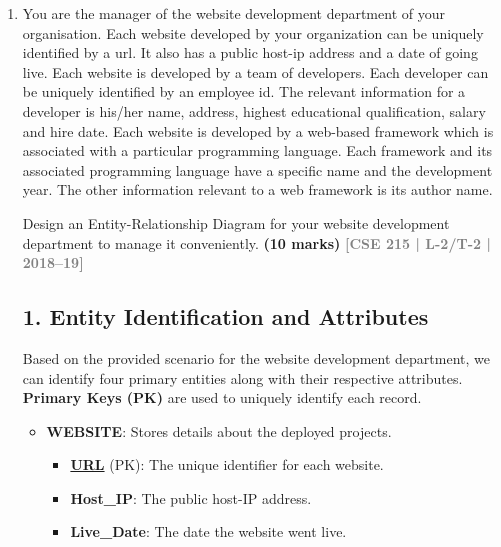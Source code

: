 \documentclass[12pt,a3paper]{article}
\newcommand{\yr}[1]{\hfill\textcolor{gray}{\small\textbf{[#1]}}}
\newcommand{\mk}[1]{\textcolor{orange!70!black}{\small\textbf{(#1 marks)}}}
\begin{document}
\begin{enumerate}


\item You are the manager of the website development department of your organisation.
Each website developed by your organization can be uniquely identified by a url. It also has
a public host-ip address and a date of going live. Each website is developed by a team of
developers. Each developer can be uniquely identified by an employee id. The relevant information
for a developer is his/her name, address, highest educational qualification, salary
and hire date. Each website is developed by a web-based framework which is associated
with a particular programming language. Each framework and its associated programming
language have a specific name and the development year. The other information relevant
to a web framework is its author name.

Design an Entity-Relationship Diagram for your website development department to manage it conveniently. 
\mk{10} \yr{CSE 215 | L-2/T-2 | 2018--19}

\begin{tcolorbox}[enhanced,breakable,ansbox,colback=cA!4,colframe=cA,boxrule=0.8pt,arc=5pt,title={\textbf{Answer}},fonttitle=\bfseries\color{white},colbacktitle=cA]

\subsection*{1. Entity Identification and Attributes}
Based on the provided scenario for the website development department, we can identify four primary entities along with their respective attributes. \textbf{Primary Keys (PK)} are used to uniquely identify each record.

\begin{itemize}[leftmargin=2em, itemsep=0.5em]
    \item \textbf{WEBSITE}: Stores details about the deployed projects.
    \begin{itemize}[label={--}, itemsep=1pt]
        \item \underline{\textbf{URL}} (PK): The unique identifier for each website.
        \item \textbf{Host\_IP}: The public host-IP address.
        \item \textbf{Live\_Date}: The date the website went live.
    \end{itemize}


\end{itemize}
\end{tcolorbox}
\end{enumerate}
\end{document}
